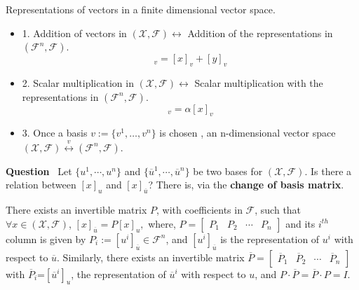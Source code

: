     \Qed
    
    

\begin{fact} Representations of vectors in a finite dimensional vector space.
    \begin{itemize}
        \item[] 1. Addition of vectors in $(\mathcal{X},\mathcal{F}) \longleftrightarrow$ Addition of the representations in $(\mathcal{F}^n,\mathcal{F})$.
        \begin{equation*}
            [x+y]_v=[x]_v+[y]_v
        \end{equation*}
        \item[] 2. Scalar multiplication in $(\mathcal{X},\mathcal{F}) \longleftrightarrow$ Scalar multiplication with the representations in $(\mathcal{F}^n,\mathcal{F})$.
        \begin{equation*}
            [\alpha x]_v=\alpha[x]_v
        \end{equation*}
        \item[] 3. Once a basis $v:=\{v^1, \ldots,v^n\}$ is chosen , an n-dimensional vector space $(\mathcal{X},\mathcal{F}) \overset{v}{\longleftrightarrow} (\mathcal{F}^n,\mathcal{F})$.
    \end{itemize}
    \end{fact}
    
    \vspace*{.2cm}

\textbf{Question}~ Let $\{u^1, \dotsb, u^n\}$ and $\{\overline{u}^1, \dotsb, \overline{u}^n\}$ be two bases for $(\mathcal{X},\mathcal{F})$. Is there a relation between $[x]_u$ and $[x]_{\overline{u}}$?  There is, via the \textbf{change of basis matrix}.

 \vspace*{.2cm}

\begin{thm}
There exists an invertible matrix $P$, with coefficients in $\mathcal{F}$, such that $\forall x\in(\mathcal{X},\mathcal{F})$, 
$[x]_{\overline{u}}=P[x]_u,$
    where, $P=\left[ \begin{array}{cccc} P_1 &P_2 & \dotsb & P_n \end{array} \right]$ and its $i^{th}$ column is given by $P_i:=[u^i]_{\overline{u}}\in\mathcal{F}^{n}$, and $[u^i]_{\overline{u}}$ is the representation of $u^i$ with respect to $\overline{u}$. Similarly, there exists an invertible matrix $\overline{P} = \left[ \begin{array}{cccc} \overline{P}_{1} & \overline{P}_{2} &  \dotsb   & \overline{P}_{n}\end{array} \right]$ with $\overline{P}_{i}$=$[\overline{u}^{i}]_{u}$, the representation of $\overline{u}^i$ with respect to $u$, and $P \cdot \overline{P} = \overline{P} \cdot P = I$.
    
\end{thm} 



